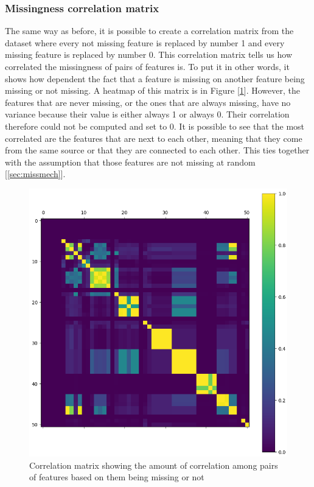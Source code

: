 \documentclass[11pt]{article}
\begin{document}
      \subsubsection{Missingness correlation matrix}
        The same way as before, it is possible to create a correlation matrix from the dataset where every not missing feature is replaced by number 1 and every missing feature is replaced by number 0. This correlation matrix tells us how correlated the missingness of pairs of features is. To put it in other words, it shows how dependent the fact that a feature is missing on another feature being missing or not missing. A heatmap of this matrix is in Figure [\ref{figure:missingness_matrix}]. However, the features that are never missing, or the ones that are always missing, have no variance because their value is either always 1 or always 0. Their correlation therefore could not be computed and set to 0. It is possible to see that the most correlated are the features that are next to each other, meaning that they come from the same source or that they are connected to each other. This ties together with the assumption that those features are not missing at random [\ref{sec:missmech}].
        \begin{figure}
          \centering
          \includegraphics[scale=0.5]{thesis_res/miss/heatmap_cropped.png}
          \caption{Correlation matrix showing the amount of correlation among pairs of features based on them being missing or not}
          \label{figure:missingness_matrix}
        \end{figure}
      \newpage
\end{document}
